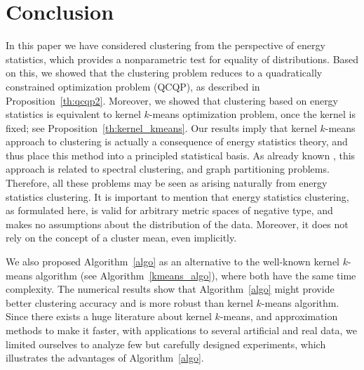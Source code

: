 \documentclass[aps,preprint,nofootinbib,floatfix]{revtex4-1}
\begin{document}
\section{Conclusion}
\label{sec:conclusion}

In this paper we have considered clustering from the perspective of energy
statistics, which provides a nonparametric test for equality of distributions.
Based on this, we showed that the clustering problem reduces to a quadratically
constrained optimization problem (QCQP), 
as described in Proposition~\ref{th:qcqp2}.
Moreover, we showed that clustering based on energy statistics is equivalent
to kernel $k$-means optimization problem, once the kernel is fixed; see
Proposition~\ref{th:kernel_kmeans}. Our results imply that kernel $k$-means
approach to clustering is actually a consequence of energy statistics
theory, and thus place this method into a principled statistical basis.
As already known \cite{Dhillon}, this approach is related to spectral
clustering, and graph partitioning problems. Therefore, all these problems 
may be seen as arising naturally from energy statistics clustering.
It is important to mention that energy statistics clustering, as formulated
here, is valid for
arbitrary metric spaces of negative type, and makes no assumptions about
the distribution of the data. Moreover, it does not rely on the concept of a
cluster mean, even implicitly.

We also proposed Algorithm~\ref{algo} as an alternative to the well-known
kernel $k$-means algorithm (see Algorithm~\ref{kmeans_algo}), 
where both have the same time
complexity. The numerical results show that Algorithm~\ref{algo}
might provide better clustering accuracy and is more robust 
than kernel $k$-means algorithm. Since there exists a huge literature about
kernel $k$-means, and approximation methods to make it faster, with
applications to several artificial and real data, 
we limited ourselves to analyze few but carefully designed experiments, which
illustrates the advantages of Algorithm~\ref{algo}.


\bigskip





\end{document}
